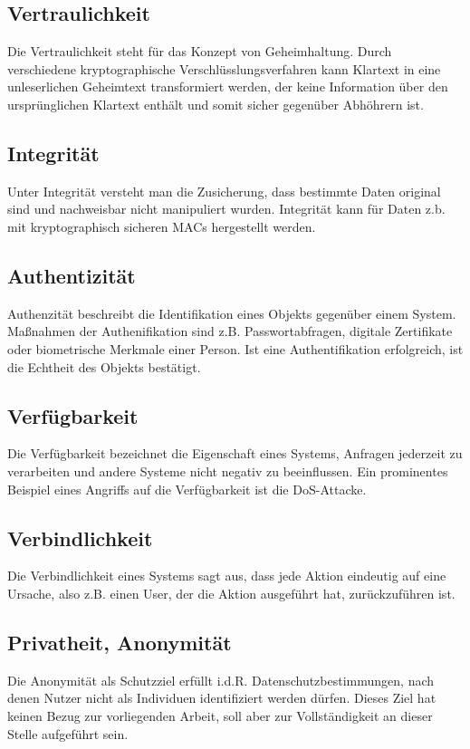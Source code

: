 \documentclass[../main.tex]{subfiles}
\begin{document}


    \subsection{Vertraulichkeit}
			Die Vertraulichkeit steht für das Konzept von Geheimhaltung. Durch verschiedene kryptographische Verschlüsslungsverfahren kann Klartext in eine unleserlichen Geheimtext transformiert werden, der keine Information über den ursprünglichen Klartext enthält und somit sicher gegenüber Abhöhrern ist.
    \subsection{Integrität}
			Unter Integrität versteht man die Zusicherung, dass bestimmte Daten original sind und nachweisbar nicht manipuliert wurden. Integrität kann für Daten z.b. mit kryptographisch sicheren MACs hergestellt werden.
		\subsection{Authentizität}
			Authenzität beschreibt die Identifikation eines Objekts gegenüber einem System. Maßnahmen der Authenifikation sind z.B. Passwortabfragen, digitale Zertifikate oder biometrische Merkmale einer Person. Ist eine Authentifikation erfolgreich, ist die Echtheit des Objekts bestätigt.
    \subsection{Verfügbarkeit}
			Die Verfügbarkeit bezeichnet die Eigenschaft eines Systems, Anfragen jederzeit zu verarbeiten und andere Systeme nicht negativ zu beeinflussen. Ein prominentes Beispiel eines Angriffs auf die Verfügbarkeit ist die \acrshort{DoS}-Attacke.
    \subsection{Verbindlichkeit}
			Die Verbindlichkeit eines Systems sagt aus, dass jede Aktion eindeutig auf eine Ursache, also z.B. einen User, der die Aktion ausgeführt hat, zurückzuführen ist.
		\subsection{Privatheit, Anonymität}
			Die Anonymität als Schutzziel erfüllt i.d.R. Datenschutzbestimmungen, nach denen Nutzer nicht als Individuen identifiziert werden dürfen. Dieses Ziel hat keinen Bezug zur vorliegenden Arbeit, soll aber zur Vollständigkeit an dieser Stelle aufgeführt sein.
\end{document}
